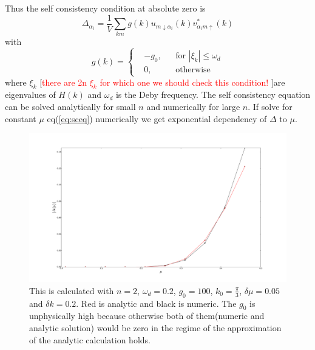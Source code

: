 \documentclass[%
 preprint,
 amsmath,amssymb,
 aps,
]{revtex4-1}
\begin{document}
Thus the self consistency condition  at absolute zero is
\begin{equation}
\Delta_{\alpha_i}=\frac{1}{V}\sum_{k m}g(k)u_{m\downarrow\alpha_i}(k)v^{*}_{\alpha_i m\uparrow}(k)\label{eq:sceq}
\end{equation}
with
\begin{equation}
g(k)=\left\{
\begin{aligned}
&-g_0,&& \text{for }|\xi_k|\leq\omega_d \\
& 0, && \text{otherwise} 
\end{aligned} \right.
\end{equation}
where $\xi_k$ [\textcolor{red}{there are 2n $\xi_k$  for which one we should check this condition! }]are eigenvalues of $H(k)$ and $\omega_d$ is the Deby frequency. The self consistency equation can be solved analytically for small $n$ and numerically for large $n$. If solve for constant $\mu$ eq(\ref{eq:sceq}) numerically we get exponential dependency of $\Delta$ to $\mu$.
\begin{figure}[h!]
\begin{center}
\includegraphics[width=1\textwidth]{delta_vs_mu_prop.pdf}
\caption{This is calculated with $n=2$, $\omega_d=0.2$, $g_0=100$, $k_0=\frac{{\pi}}{3}$, $\delta\mu=0.05$ and $\delta k=0.2$. Red is analytic and black is numeric. The $g_0$ is unphysically high because otherwise both of them(numeric and analytic solution) would be zero in the regime of the  approximation of  the analytic calculation  holds.}
\end{center}
\end{figure}
\end{document}
